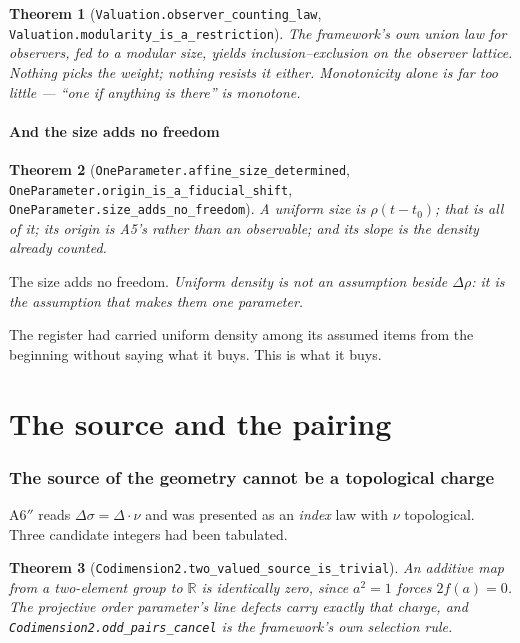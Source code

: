 \documentclass[11pt,a4paper]{article}
\newtheorem{theorem}{Theorem}[section]
\theoremstyle{definition}
\theoremstyle{remark}
\newcommand{\lean}[1]{\texttt{\small #1}}
\newcommand{\sg}{\sigma}
\newcommand{\App}{\ensuremath{\mathrm{A6}''}}
\begin{document}
\begin{theorem}[\lean{Valuation.observer\_counting\_law},
\lean{Valuation.modularity\_is\_a\_restriction}]
The framework's own union law for observers, fed to a \emph{modular} size, yields
inclusion--exclusion on the observer lattice. Nothing picks the weight; nothing
resists it either. Monotonicity alone is far too little --- ``one if anything is
there'' is monotone.
\end{theorem}

\subsection{And the size adds no freedom}

\begin{theorem}[\lean{OneParameter.affine\_size\_determined},
\lean{OneParameter.origin\_is\_a\_fiducial\_shift},
\lean{OneParameter.size\_adds\_no\_freedom}]
A uniform size is $\rho(t-t_0)$; that is all of it; its origin is A5's rather than
an observable; and its slope \emph{is} the density already counted.
\end{theorem}

\begin{claimbox}
The size adds no freedom. \emph{Uniform density is not an assumption beside
$\Delta\rho$: it is the assumption that makes them one parameter.}
\end{claimbox}

The register had carried uniform density among its assumed items from the beginning
without saying what it buys. This is what it buys.

\part{The source and the pairing}

\section{The source of the geometry cannot be a topological charge}
\label{sec:topology}

\App{} reads $\Delta\sg=\Delta\cdot\nu$ and was presented as an \emph{index} law
with $\nu$ topological. Three candidate integers had been tabulated.

\begin{theorem}[\lean{Codimension2.two\_valued\_source\_is\_trivial}]
An additive map from a two-element group to $\mathbb{R}$ is identically zero, since
$a^{2}=1$ forces $2f(a)=0$. The projective order parameter's line defects carry
exactly that charge, and \lean{Codimension2.odd\_pairs\_cancel} is the framework's
own selection rule.
\end{theorem}
\end{document}
